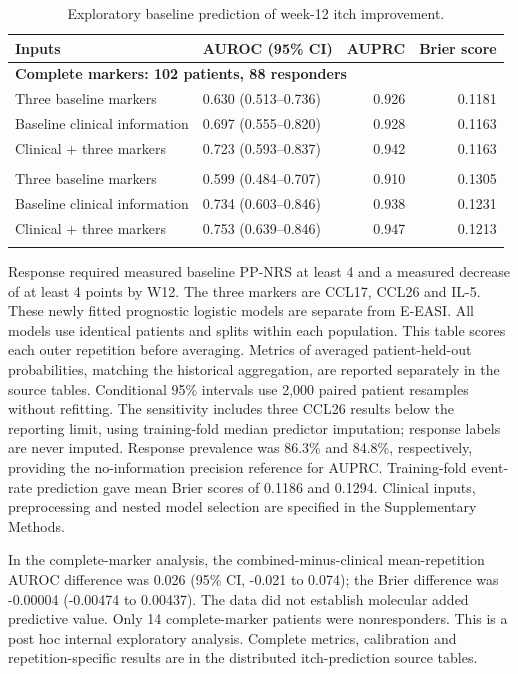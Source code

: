 \begin{table}[htbp]
\centering\small
\caption{Exploratory baseline prediction of week-12 itch improvement.}\label{tab:itch_prediction}
\begin{tabular}{p{51mm}p{43mm}rr}\toprule
Inputs & AUROC (95\% CI) & AUPRC & Brier score \\ \midrule
\multicolumn{4}{l}{\textbf{Complete markers: 102 patients, 88 responders}} \\
Three baseline markers & 0.630 (0.513--0.736) & 0.926 & 0.1181 \\
Baseline clinical information & 0.697 (0.555--0.820) & 0.928 & 0.1163 \\
Clinical + three markers & 0.723 (0.593--0.837) & 0.942 & 0.1163 \\
\addlinespace
\multicolumn{4}{l}{\textbf{Predictor-imputation sensitivity: 105 patients, 89 responders}} \\
Three baseline markers & 0.599 (0.484--0.707) & 0.910 & 0.1305 \\
Baseline clinical information & 0.734 (0.603--0.846) & 0.938 & 0.1231 \\
Clinical + three markers & 0.753 (0.639--0.846) & 0.947 & 0.1213 \\
\addlinespace
\bottomrule\end{tabular}
\par\small\raggedright Response required measured baseline PP-NRS at least 4 and a measured decrease of at least 4 points by W12. The three markers are CCL17, CCL26 and IL-5. These newly fitted prognostic logistic models are separate from E-EASI. All models use identical patients and splits within each population. This table scores each outer repetition before averaging. Metrics of averaged patient-held-out probabilities, matching the historical aggregation, are reported separately in the source tables. Conditional 95\% intervals use 2,000 paired patient resamples without refitting. The sensitivity includes three CCL26 results below the reporting limit, using training-fold median predictor imputation; response labels are never imputed. Response prevalence was 86.3\% and 84.8\%, respectively, providing the no-information precision reference for AUPRC. Training-fold event-rate prediction gave mean Brier scores of 0.1186 and 0.1294. Clinical inputs, preprocessing and nested model selection are specified in the Supplementary Methods.

In the complete-marker analysis, the combined-minus-clinical mean-repetition AUROC difference was 0.026 (95\% CI, -0.021 to 0.074); the Brier difference was -0.00004 (-0.00474 to 0.00437). The data did not establish molecular added predictive value. Only 14 complete-marker patients were nonresponders. This is a post hoc internal exploratory analysis. Complete metrics, calibration and repetition-specific results are in the distributed itch-prediction source tables.
\end{table}
